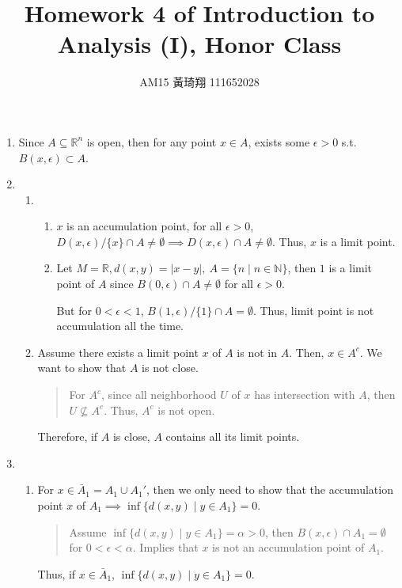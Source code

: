 \documentclass[12pt]{article}
\title{Homework 4 of Introduction to Analysis (I), Honor Class}
\author{AM15 黃琦翔 111652028}
\begin{document}
\maketitle
\begin{enumerate}
    \item Since $A \subseteq \mathbb{R}^n$ is open,
    then for any point $x \in A$, exists some $\epsilon > 0$ s.t. $B(x, \epsilon) \subset A$.

    \item\begin{enumerate}
        \item\begin{enumerate}
            \item $x$ is an accumulation point, for all $\epsilon > 0$, $D(x, \epsilon)/\lbrace x \rbrace \cap A \neq \emptyset\implies D(x, \epsilon) \cap A \neq \emptyset$.
            Thus, $x$ is a limit point.
            \item Let $M = \mathbb{R}, d(x, y) = |x-y|,\ A = \lbrace n \mid n \in \mathbb{N}\rbrace$, then $1$ is a limit point of $A$ since $B(0, \epsilon) \cap A \neq \emptyset$ for all $\epsilon > 0$.
            
            But for $0 < \epsilon < 1$, $B(1, \epsilon)/\lbrace 1 \rbrace \cap A = \emptyset$. Thus, limit point is not accumulation all the time.
        \end{enumerate}
        \item Assume there exists a limit point $x$ of $A$ is not in $A$.
        Then, $x \in A^c$. We want to show that $A$ is not close.
        \begin{quote}
            For $A^c$, since all neighborhood $U$ of $x$ has intersection with $A$, then $U \nsubseteq A^c$. 
            Thus, $A^c$ is not open.
        \end{quote}

        Therefore, if $A$ is close, $A$ contains all its limit points.
    \end{enumerate}
    \newpage

    \item \begin{enumerate}
        \item For $x \in \bar{A}_1 = A_1\cup A_1'$, then we only need to show that the accumulation point $x$ of $A_1\implies \inf\lbrace d(x, y)\mid y \in A_1\rbrace = 0$.
        \begin{quote}
            Assume $\inf\lbrace d(x, y)\mid y \in A_1\rbrace = \alpha > 0$, then $B(x, \epsilon) \cap A_1 = \emptyset$ for $0 < \epsilon < \alpha$.
            Implies that $x$ is not an accumulation point of $A_1$.
        \end{quote}
        Thus, if $x \in \bar{A}_1$, $\inf \lbrace d(x, y) \mid y \in A_1\rbrace = 0$. 


\end{enumerate}
\end{enumerate}
\end{document}
